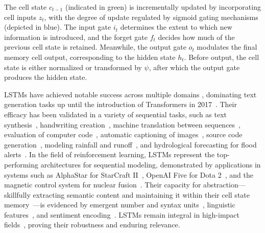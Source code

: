 The cell state $c_{t-1}$ (indicated in green) is incrementally updated by incorporating cell inputs $z_t$, with the degree of update regulated by sigmoid gating mechanisms (depicted in blue). The input gate $i_t$ determines the extent to which new information is introduced, and the forget gate $f_t$ decides how much of the previous cell state is retained. Meanwhile, the output gate $o_t$ modulates the final memory cell output, corresponding to the hidden state $h_t$. Before output, the cell state is either normalized or transformed by $\psi$, after which the output gate produces the hidden state.

LSTMs have achieved notable success across multiple domains \citep{Hochreiter:01,Hochreiter:07,Schmidhuber:15}, dominating text generation tasks up until the introduction of Transformers in 2017~\citep{Vaswani:17}. Their efficacy has been validated in a variety of sequential tasks, such as text synthesis~\citep{Graves:13,Karpathy:15blog}, handwriting creation~\citep{Graves:13}, machine translation between sequences~\citep{Sutskever:14nips}, evaluation of computer code~\citep{Zaremba:14arxiv}, automatic captioning of images~\citep{Karpathy:15,Hossain:19}, source code generation~\citep{Karpathy:15blog}, modeling rainfall and runoff~\citep{Kratzert:18,Kratzert:19}, and hydrological forecasting for flood alerts~\citep{Nearing:24}. In the field of reinforcement learning, LSTMs represent the top-performing architectures for sequential modeling, demonstrated by applications in systems such as AlphaStar for StarCraft II~\citep{Vinyals:17short}, OpenAI Five for Dota 2~\citep{OpenAI:19}, and the magnetic control system for nuclear fusion~\citep{Degrave:22short}. Their capacity for abstraction—skillfully extracting semantic content and maintaining it within their cell state memory~\citep{Karpathy:15blog}—is evidenced by emergent number and syntax units~\citep{Lakretz:19}, linguistic features~\citep{Bau:19}, and sentiment encoding~\citep{Radford:17arxiv}. LSTMs remain integral in high-impact fields~\citep{Degrave:22short,Nearing:24}, proving their robustness and enduring relevance.

